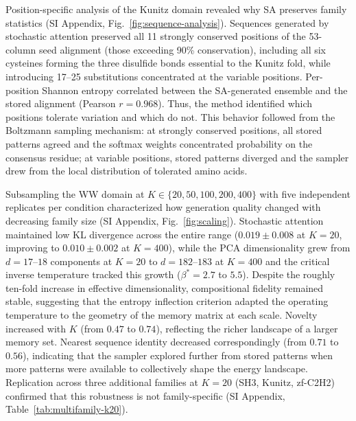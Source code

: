 Position-specific analysis of the Kunitz domain revealed why SA preserves family statistics (SI Appendix, Fig.~\ref{fig:sequence-analysis}). Sequences generated by stochastic attention preserved all 11 strongly conserved positions of the 53-column seed alignment (those exceeding 90\% conservation), including all six cysteines forming the three disulfide bonds essential to the Kunitz fold, while introducing 17--25 substitutions concentrated at the variable positions. Per-position Shannon entropy correlated between the SA-generated ensemble and the stored alignment (Pearson $r{=}0.968$). Thus, the method identified which positions tolerate variation and which do not. This behavior followed from the Boltzmann sampling mechanism: at strongly conserved positions, all stored patterns agreed and the softmax weights concentrated probability on the consensus residue; at variable positions, stored patterns diverged and the sampler drew from the local distribution of tolerated amino acids.

Subsampling the WW domain at $K \in \{20, 50, 100, 200, 400\}$ with five independent replicates per condition characterized how generation quality changed with decreasing family size (SI Appendix, Fig.~\ref{fig:scaling}). Stochastic attention maintained low KL divergence across the entire range ($0.019 \pm 0.008$ at $K{=}20$, improving to $0.010 \pm 0.002$ at $K{=}400$), while the PCA dimensionality grew from $d{=}17$--$18$ components at $K{=}20$ to $d{=}182$--$183$ at $K{=}400$ and the critical inverse temperature tracked this growth ($\beta^*{=}2.7$ to $5.5$). Despite the roughly ten-fold increase in effective dimensionality, compositional fidelity remained stable, suggesting that the entropy inflection criterion adapted the operating temperature to the geometry of the memory matrix at each scale. Novelty increased with $K$ (from $0.47$ to $0.74$), reflecting the richer landscape of a larger memory set. Nearest sequence identity decreased correspondingly (from $0.71$ to $0.56$), indicating that the sampler explored further from stored patterns when more patterns were available to collectively shape the energy landscape. Replication across three additional families at $K{=}20$ (SH3, Kunitz, zf-C2H2) confirmed that this robustness is not family-specific (SI Appendix, Table~\ref{tab:multifamily-k20}).

